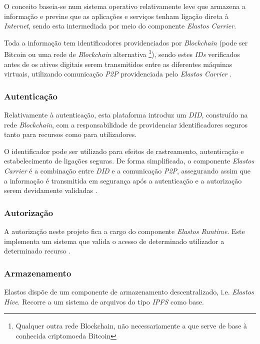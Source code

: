 O conceito baseia-se num sistema operativo relativamente leve que armazena a informação e previne que as aplicações e serviços tenham ligação direta à \emph{Internet}, sendo esta intermediada por meio do componente \emph{Elastos Carrier}. 

Toda a informação tem identificadores providenciados por \emph{Blockchain} (pode ser Bitcoin ou uma rede de \emph{Blockchain} alternativa \footnote{Qualquer outra rede Blockchain, não necessariamente a que serve de base à conhecida criptomoeda Bitcoin}), sendo estes \emph{IDs} verificados antes de os ativos digitais serem transmitidos entre as diferentes máquinas virtuais, utilizando comunicação \emph{\acrfull{P2P}} \cite{what_are_P2P_networks} providenciada pelo \emph{Elastos Carrier} \cite{elastos_developer}.

\subsubsection{Autenticação}

Relativamente à autenticação, esta plataforma introduz um \emph{\acrfull{DID}}, construído na rede \emph{Blockchain}, com a responsabilidade de providenciar identificadores seguros tanto para recursos como para utilizadores.

O identificador pode ser utilizado para efeitos de rastreamento, autenticação e estabelecimento de ligações seguras. De forma simplificada, o componente \emph{Elastos Carrier} é a combinação entre \emph{\acrshort{DID}} e a comunicação \emph{\acrshort{P2P}}, assegurando assim que a informação é transmitida em segurança após a autenticação e a autorização serem devidamente validadas \cite{elastos_white_paper}.

\subsubsection{Autorização}
A autorização neste projeto fica a cargo do componente \emph{Elastos Runtime}. Este implementa um sistema que valida o acesso de determinado utilizador a determinado recurso \cite{elastos_white_paper}.

\subsubsection{Armazenamento}
Elastos dispõe de um componente de armazenamento descentralizado, i.e. \emph{Elastos Hive}. Recorre a um sistema de arquivos do tipo \emph{\acrfull{IPFS}} \cite{ipfs} como base. 

